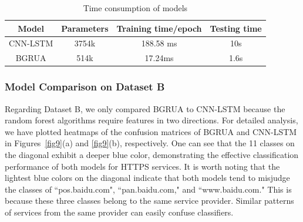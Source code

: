 \documentclass[preprint,12pt]{elsarticle}
\begin{document}
\begin{table}[]
\caption{Time consumption of models}
\centering
\begin{tabular}{c|c|c|c}
\hline
\textbf{Model} & \textbf{Parameters} & \textbf{Training time/epoch} & \textbf{Testing time} \\ \hline
CNN-LSTM            & 3754k            &                    
188.58 ms   &         10s           \\ \hline
BGRUA                & 514k             &                      17.24ms     &         1.6s          \\ \hline
\end{tabular}

\label{tab11}
\end{table}


\subsubsection{Model Comparison on Dataset B}
Regarding Dataset B, we only compared BGRUA to CNN-LSTM because the random forest algorithms require features in two directions. For detailed analysis, we have plotted heatmaps of the confusion matrices of BGRUA and CNN-LSTM in Figures~\ref{fig9}(a) and \ref{fig9}(b), respectively. 
One can see that the 11 classes on the diagonal exhibit a deeper blue color, demonstrating the effective classification performance of both models for HTTPS services. It is worth noting that the lightest blue colors on the diagonal indicate that both models tend to misjudge the classes of ``pos.baidu.com", ``pan.baidu.com," and ``www.baidu.com." This is because these three classes belong to the same service provider. Similar patterns of services from the same provider can easily confuse classifiers.
\end{document}
